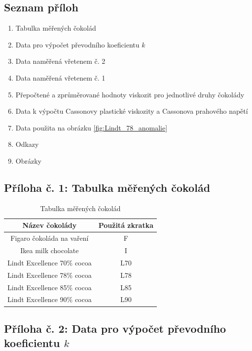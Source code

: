 \documentclass[12pt]{article}
\begin{document}
\subsection*{Seznam příloh}
\begin{enumerate}[noitemsep, topsep = 0pt]
    \item Tabulka měřených čokolád
    \item Data pro výpočet převodního koeficientu $k$
    \item Data naměřená vřetenem č. 2
    \item Data naměřená vřetenem č. 1
    \item Přepočtené a zprůměrované hodnoty viskozit pro jednotlivé druhy čokolády
    \item Data k výpočtu Cassonovy plastické viskozity a Cassonova prahového napětí
    \item Data použita na obrázku \ref{fig:Lindt_78_anomalie}
    \item Odkazy
    \item Obrázky
\end{enumerate}


\newpage
\subsection*{Příloha č. 1: Tabulka měřených čokolád}

\begin{table}[!h]
    \centering
    \begin{NiceTabular}{|c|c|}
        \hline
        Název čokolády & Použitá zkratka \\ \hline\hline
        Figaro čokoláda na vaření & F \\ \hline
        Ikea milk chocolate & I \\ \hline
        Lindt Excellence 70\% cocoa & L70 \\ \hline
        Lindt Excellence 78\% cocoa & L78 \\ \hline
        Lindt Excellence 85\% cocoa & L85 \\ \hline
        Lindt Excellence 90\% cocoa & L90 \\      
        \hline
    \end{NiceTabular}
    \caption{Tabulka měřených čokolád}
    \label{tab:cokolady}
\end{table} %

\subsection*{Příloha č. 2: Data pro výpočet převodního koeficientu $k$}
\end{document}
